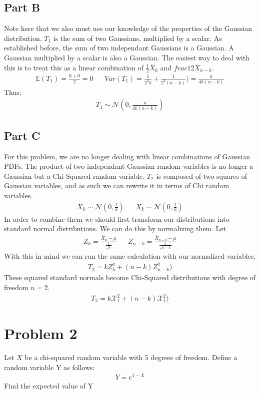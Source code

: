 \documentclass{article}
\begin{document}
\subsection*{Part B}
Note here that we also must use our knowledge of the properties of the Gaussian distribution. $T_1$ is the sum of two Gaussians, multiplied by a scalar. As established before, the sum of two independant Gaussians is a Gaussian. A Gaussian multiplied by a scalar is also a Gaussian. The easiest way to deal with this is to treat this as a linear combination of $\frac{1}{2}\bar{X}_k$ and $frac{1}{2}\bar{X}_{n-k}$.
\begin{align*}
\mathbb{E}(T_1) = \frac{0+0}{2} = 0 && Var(T_1) = \frac{1}{2^2k} + \frac{1}{2^2(n-k)}) = \frac{n}{4k(n-k)}
\end{align*}
Thus:
\begin{align*}
\boxed{ T_1 \sim \mathcal{N}(0,\tfrac{n}{4k(n-k)}) }
\end{align*}
\subsection*{Part C}
For this problem, we are no longer dealing with linear combinations of Gaussian PDFs. The product of two independant Gaussian random variables is no longer a Gaussian but a Chi-Squared random variable. $T_2$ is composed of two squares of Gaussian variables, and as such we can rewrite it in terms of Chi random variables.
\begin{align*}
\bar{X}_k \sim \mathcal{N}(0,\frac{1}{k}) && \bar{X}_k \sim \mathcal{N}(0,\frac{1}{k})
\end{align*}
In order to combine them we should first transform our distributions into standard normal distributions. We can do this by normalizing them. Let 
\begin{align*}
Z_{k} = \frac{\bar{X}_{n}-\mu}{\frac{1}{\sqrt{k}}} && Z_{n-k} = \frac{\bar{X}_{n-k} - \mu}{\frac{1}{\sqrt{n-k}}}
\end{align*}
With this in mind we can run the same calculation with our normalized variables.
\begin{align*}
T_2 = k Z_{k}^2 + (n-k) Z_{n-k}^{2})
\end{align*}
These squared standard normals become Chi-Squared distributions with degree of freedom $n=2$.
\begin{align*}
T_2 = k \mathcal{X}^{2}_{1} + (n-k) \mathcal{X}^{2}_{1})
\end{align*}
\clearpage

\section*{Problem 2}
Let $X$ be a chi-squared random variable with 5 degrees of freedom. Define a random
variable Y as follows:
\begin{align*}
Y = e^{1-X}
\end{align*}
Find the expected value of Y
\end{document}
